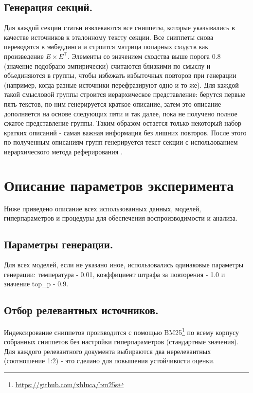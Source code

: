 \documentclass{article}
\begin{document}
\subsection*{Генерация секций.}
Для каждой секции статьи извлекаются все сниппеты, которые указывались в качестве источников к эталонному тексту секции. 
Все сниппеты снова переводятся в эмбеддинги и строится матрица попарных сходств как произведение \(E \times E^\top\).
Элементы со значением сходства выше порога 0.8 (значение подобрано эмпирически) считаются близкими по смыслу и объединяются в группы, 
чтобы избежать избыточных повторов при генерации (например, когда разные источники перефразируют одно и то же). 
Для каждой такой смысловой группы строится иерархическое представление: берутся первые пять текстов, по ним генерируется краткое описание, 
затем это описание дополняется на основе следующих пяти и так далее, пока не получено полное сжатое представление группы.
Таким образом остается только некоторый набор кратких описаний - самая важная информация без лишних повторов.
После этого по полученным описаниям групп генерируется текст секции с использованием иерархического метода реферирования \cite{hier}.

\section*{Описание параметров эксперимента}
Ниже приведено описание всех использованных данных, моделей, гиперпараметров и процедуры для обеспечения воспроизводимости и анализа.

\subsection*{Параметры генерации.}
Для всех моделей, если не указано иное, использовались одинаковые параметры генерации: температура - 0.01, коэффициент штрафа за повторения - 1.0 и значение top\_p - 0.9.

\subsection*{Отбор релевантных источников.}
Индексирование сниппетов производится с помощью BM25\footnote{\url{https://github.com/xhluca/bm25s}} по всему корпусу собранных сниппетов без настройки гиперпараметров (стандартные значения).
Для каждого релевантного документа выбираются два нерелевантных (соотношение 1:2) - это сделано для повышения устойчивости оценки.
\end{document}
